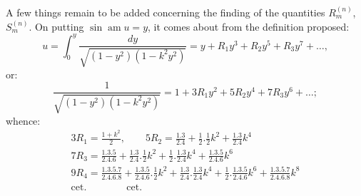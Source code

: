 \documentclass{article}
\begin{document}
A few things remain to be added concerning the finding of the quantities $R_{m}^{(n)}$, $S_{m}^{(n)}$. On putting $\sin\operatorname{am}u=y$, it comes about from the definition proposed:
\[
u=\int_{0}^{y}\frac{dy}{\sqrt{(1-y^{2})(1-k^{2}y^{2})}}=y+R_{1}y^{3}+R_{2}y^{5}+R_{3}y^{7}+\ldots,
\]
or:
\[
\frac{1}{\sqrt{(1-y^{2})(1-k^{2}y^{2})}}=1+3R_{1}y^{2}+5R_{2}y^{4}+7R_{3}y^{6}+\ldots;
\]
whence:
\[
\begin{gathered}
3R_{1}=\frac{1+k^{2}}{2},\qquad 5R_{2}=\frac{1.3}{2.4}+\frac{1}{2}.\frac{1}{2}k^{2}+\frac{1.3}{2.4}k^{4}\\[1.5ex]
7R_{3}=\frac{1.3.5}{2.4.6}+\frac{1.3}{2.4}.\frac{1}{2}k^{2}+\frac{1}{2}.\frac{1.3}{2.4}k^{4}+\frac{1.3.5}{2.4.6}k^{6}\\[1.5ex]
9R_{4}=\frac{1.3.5.7}{2.4.6.8}+\frac{1.3.5}{2.4.6}.\frac{1}{2}k^{2}+\frac{1.3}{2.4}.\frac{1.3}{2.4}k^{4}+\frac{1}{2}.\frac{1.3.5}{2.4.6}k^{6}+\frac{1.3.5.7}{2.4.6.8}k^{8}\\[1.5ex]
\text{cet.}\qquad\qquad\text{cet.}
\end{gathered}
\]
\end{document}
